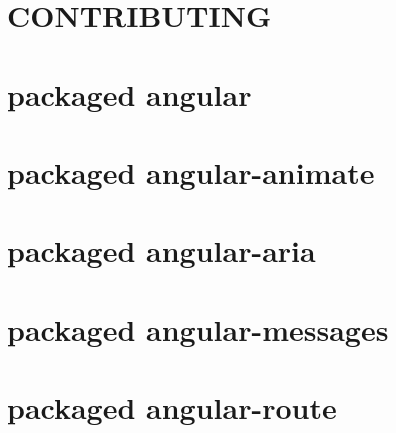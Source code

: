 \documentclass[twoside]{book}
\newcommand{\+}{\discretionary{\mbox{\scriptsize$\hookleftarrow$}}{}{}}
\begin{document}
\chapter{C\+O\+N\+T\+R\+I\+B\+U\+T\+I\+NG}
\label{md_app_web_bower_components_ng-table__c_o_n_t_r_i_b_u_t_i_n_g}

\chapter{packaged angular}
\label{md_app_web_bower_components_ng-table_docs_app_vendor_angular__r_e_a_d_m_e}

\chapter{packaged angular-\/animate}
\label{md_app_web_bower_components_ng-table_docs_app_vendor_angular-animate__r_e_a_d_m_e}

\chapter{packaged angular-\/aria}
\label{md_app_web_bower_components_ng-table_docs_app_vendor_angular-aria__r_e_a_d_m_e}

\chapter{packaged angular-\/messages}
\label{md_app_web_bower_components_ng-table_docs_app_vendor_angular-messages__r_e_a_d_m_e}

\chapter{packaged angular-\/route}
\label{md_app_web_bower_components_ng-table_docs_app_vendor_angular-route__r_e_a_d_m_e}

\end{document}

